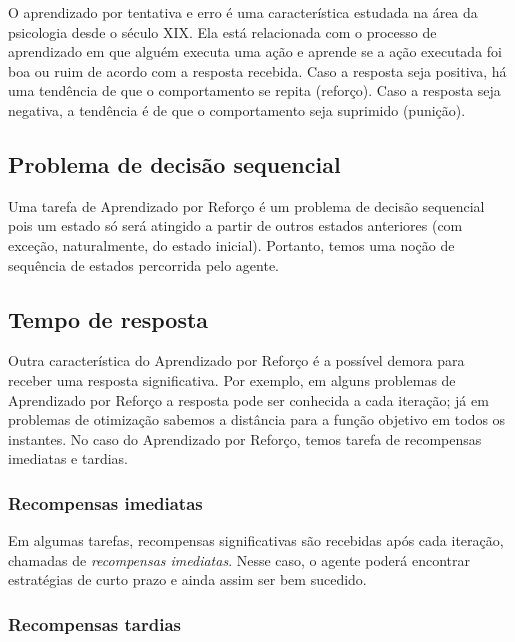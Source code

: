 \documentclass{article}
\begin{document}
            O aprendizado por tentativa e erro é uma característica estudada na área da psicologia desde o século XIX.
            Ela está relacionada com o processo de aprendizado em que alguém executa uma ação e aprende se a ação executada foi boa ou ruim de acordo com a resposta recebida.
            Caso a resposta seja positiva, há uma tendência de que o comportamento se repita (reforço).
            Caso a resposta seja negativa, a tendência é de que o comportamento seja suprimido (punição).
        
        \subsection{Problema de decisão sequencial}
        
            Uma tarefa de Aprendizado por Reforço é um problema de decisão sequencial pois um estado só será atingido a partir de outros estados anteriores (com exceção, naturalmente, do estado inicial).
            Portanto, temos uma noção de sequência de estados percorrida pelo agente.
        
        
        \subsection{Tempo de resposta}
        
            Outra característica do Aprendizado por Reforço é a possível demora para receber uma resposta significativa.
            Por exemplo, em alguns problemas de Aprendizado por Reforço a resposta pode ser conhecida a cada iteração; já em problemas de otimização sabemos a distância para a função objetivo em todos os instantes.
            No caso do Aprendizado por Reforço, temos tarefa de recompensas imediatas e tardias.
        
            \subsubsection{Recompensas imediatas}
        
                Em algumas tarefas, recompensas significativas são recebidas após cada iteração, chamadas de \emph{recompensas imediatas}.
                Nesse caso, o agente poderá encontrar estratégias de curto prazo e ainda assim ser bem sucedido.
        
            \subsubsection{Recompensas tardias}
        
\end{document}
